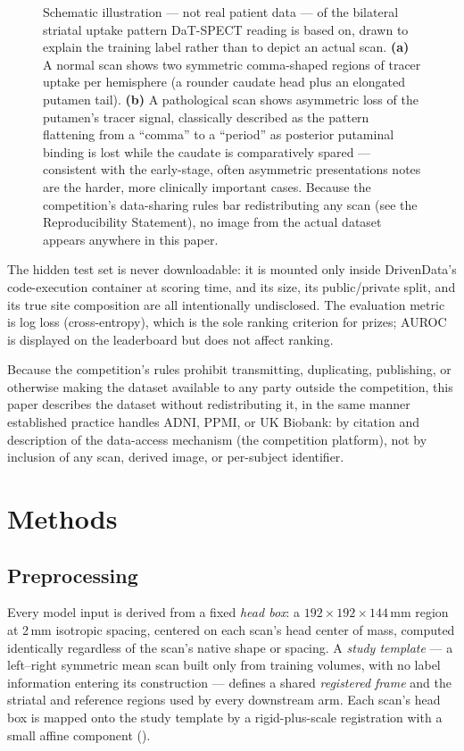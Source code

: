 \documentclass[10pt]{article}
\begin{document}
\begin{figure}[t]
\centering

\caption{Schematic illustration --- not real patient data --- of the bilateral striatal uptake pattern DaT-SPECT reading is based on, drawn to explain the training label rather than to depict an actual scan. \textbf{(a)} A normal scan shows two symmetric comma-shaped regions of tracer uptake per hemisphere (a rounder caudate head plus an elongated putamen tail). \textbf{(b)} A pathological scan shows asymmetric loss of the putamen's tracer signal, classically described as the pattern flattening from a ``comma'' to a ``period'' as posterior putaminal binding is lost while the caudate is comparatively spared --- consistent with the early-stage, often asymmetric presentations  notes are the harder, more clinically important cases. Because the competition's data-sharing rules bar redistributing any scan (see the Reproducibility Statement), no image from the actual dataset appears anywhere in this paper.}
\label{fig:schematic}
\end{figure}

The hidden test set is never downloadable: it is mounted only inside DrivenData's code-execution container at scoring time, and its size, its public/private split, and its true site composition are all intentionally undisclosed. The evaluation metric is log loss (cross-entropy), which is the sole ranking criterion for prizes; AUROC is displayed on the leaderboard but does not affect ranking.

Because the competition's rules prohibit transmitting, duplicating, publishing, or otherwise making the dataset available to any party outside the competition, this paper describes the dataset without redistributing it, in the same manner established practice handles ADNI, PPMI, or UK Biobank: by citation and description of the data-access mechanism (the competition platform), not by inclusion of any scan, derived image, or per-subject identifier.

\section{Methods}
\label{sec:methods}

\subsection{Preprocessing}
\label{sec:preprocessing}

Every model input is derived from a fixed \emph{head box}: a $192\times192\times144$\,mm region at 2\,mm isotropic spacing, centered on each scan's head center of mass, computed identically regardless of the scan's native shape or spacing. A \emph{study template} --- a left--right symmetric mean scan built only from training volumes, with no label information entering its construction --- defines a shared \emph{registered frame} and the striatal and reference regions used by every downstream arm. Each scan's head box is mapped onto the study template by a rigid-plus-scale registration with a small affine component ().
\end{document}
